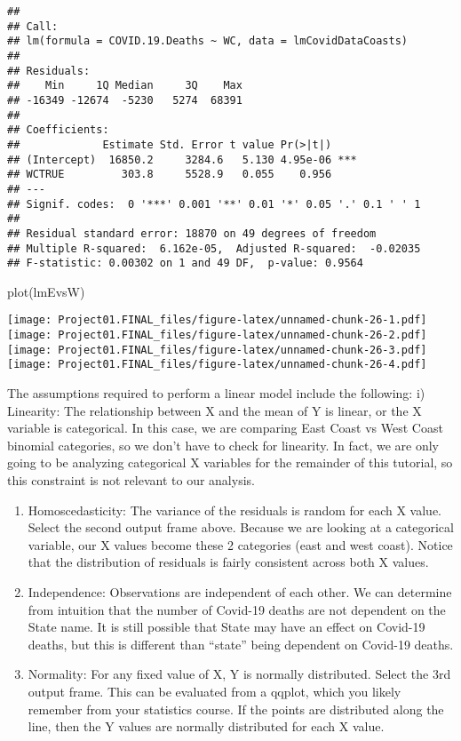 \documentclass[
]{article}
\newenvironment{Shaded}{\begin{snugshade}}{\end{snugshade}}
\newcommand{\FunctionTok}[1]{\textcolor[rgb]{0.00,0.00,0.00}{#1}}
\newcommand{\NormalTok}[1]{#1}
\begin{document}
\begin{verbatim}
## 
## Call:
## lm(formula = COVID.19.Deaths ~ WC, data = lmCovidDataCoasts)
## 
## Residuals:
##    Min     1Q Median     3Q    Max 
## -16349 -12674  -5230   5274  68391 
## 
## Coefficients:
##             Estimate Std. Error t value Pr(>|t|)    
## (Intercept)  16850.2     3284.6   5.130 4.95e-06 ***
## WCTRUE         303.8     5528.9   0.055    0.956    
## ---
## Signif. codes:  0 '***' 0.001 '**' 0.01 '*' 0.05 '.' 0.1 ' ' 1
## 
## Residual standard error: 18870 on 49 degrees of freedom
## Multiple R-squared:  6.162e-05,  Adjusted R-squared:  -0.02035 
## F-statistic: 0.00302 on 1 and 49 DF,  p-value: 0.9564
\end{verbatim}

\begin{Shaded}
\begin{Highlighting}[]
\FunctionTok{plot}\NormalTok{(lmEvsW)}
\end{Highlighting}
\end{Shaded}

\texttt{[image: Project01.FINAL\_files/figure-latex/unnamed-chunk-26-1.pdf]}
\texttt{[image: Project01.FINAL\_files/figure-latex/unnamed-chunk-26-2.pdf]}
\texttt{[image: Project01.FINAL\_files/figure-latex/unnamed-chunk-26-3.pdf]}
\texttt{[image: Project01.FINAL\_files/figure-latex/unnamed-chunk-26-4.pdf]}

The assumptions required to perform a linear model include the
following: i) Linearity: The relationship between X and the mean of Y is
linear, or the X variable is categorical. In this case, we are comparing
East Coast vs West Coast binomial categories, so we don't have to check
for linearity. In fact, we are only going to be analyzing categorical X
variables for the remainder of this tutorial, so this constraint is not
relevant to our analysis.

\begin{enumerate}
\def\labelenumi{\roman{enumi})}
\setcounter{enumi}{1}
\item
  Homoscedasticity: The variance of the residuals is random for each X
  value. Select the second output frame above. Because we are looking at
  a categorical variable, our X values become these 2 categories (east
  and west coast). Notice that the distribution of residuals is fairly
  consistent across both X values.
\item
  Independence: Observations are independent of each other. We can
  determine from intuition that the number of Covid-19 deaths are not
  dependent on the State name. It is still possible that State may have
  an effect on Covid-19 deaths, but this is different than ``state''
  being dependent on Covid-19 deaths.
\item
  Normality: For any fixed value of X, Y is normally distributed. Select
  the 3rd output frame. This can be evaluated from a qqplot, which you
  likely remember from your statistics course. If the points are
  distributed along the line, then the Y values are normally distributed
  for each X value.
\end{enumerate}
\end{document}
